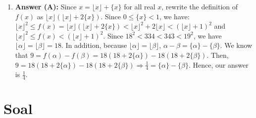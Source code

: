 \documentclass{article}
\begin{document}
\begin{enumerate}
\item \textbf{Answer (A):} Since $x=\lfloor x\rfloor+\{x\}$ for all real $x$, rewrite the definition of $f(x)$ as $\lfloor x\rfloor(\lfloor x\rfloor+2\{x\})$. Since $0\le\{x\}<1$, we have: $\lfloor x\rfloor^{2}\le f(x)=\lfloor x\rfloor(\lfloor x\rfloor+2\{x\})<\lfloor x\rfloor^{2}+2\lfloor x\rfloor<(\lfloor x\rfloor+1)^{2}$ and $\lfloor x\rfloor^{2}\le f(x)<(\lfloor x\rfloor+1)^{2}$. Since $18^{2}<334<343<19^{2}$, we have $\lfloor\alpha\rfloor=\lfloor\beta\rfloor=18$. In addition, because $\lfloor\alpha\rfloor=\lfloor\beta\rfloor$, $\alpha-\beta=\{\alpha\}-\{\beta\}$. We know that $9=f(\alpha)-f(\beta)=18(18+2\{\alpha\})-18(18+2\{\beta\})$. Then, $9=18(18+2\{\alpha\})-18(18+2\{\beta\})\Rightarrow\frac{1}{4}=\{\alpha\}-\{\beta\}$. Hence, our answer is $\frac{1}{4}$.
\end{enumerate}


\section*{Soal}
\end{document}
